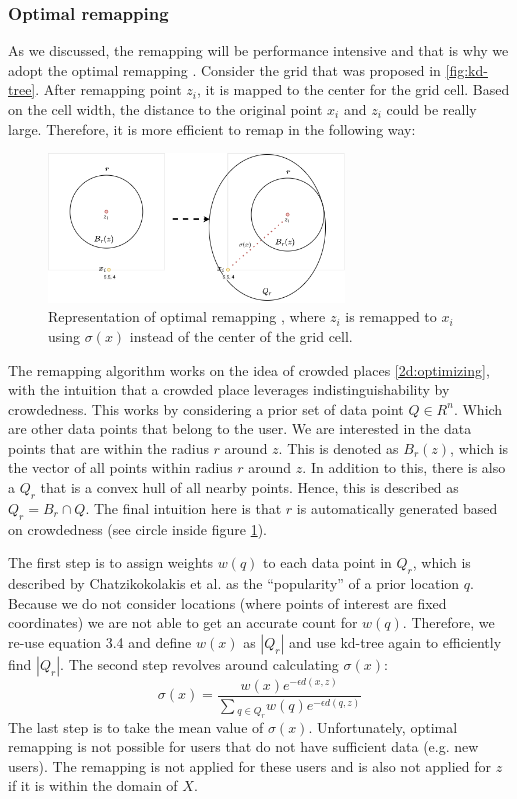 \subsubsection{Optimal remapping} \label{theory:optimal-remapping}
As we discussed, the remapping will be performance intensive and that is why we adopt the optimal remapping \citep{chatzikokolakis_efficient_2017}.
Consider the grid that was proposed in \ref{fig:kd-tree}.
After remapping point $z_i$, it is mapped to the center for the grid cell.
Based on the cell width, the distance to the original point $x_i$ and $ z_i$ could be really large.
Therefore, it is more efficient to remap in the following way:
\begin{figure}[H]
  \includegraphics[width=0.7\textwidth]{TheorethicalFramework/ND-Laplace/Images/optimal-remapping.png}
  \caption{Representation of optimal remapping \citep{chatzikokolakis_efficient_2017}, where $z_i$ is remapped to $x_i$ using $\sigma(x)$ instead of the center of the grid cell.}
  \label{fig:optimal-remapping}
\end{figure}
The remapping algorithm works on the idea of crowded places \ref{2d:optimizing}, with the intuition that a crowded place leverages indistinguishability by crowdedness.
This works by considering a prior set of data point $Q \in R^n$.
Which are other data points that belong to the user.
We are interested in the data points that are within the radius $r$ around $z$.
This is denoted as $B_r(z)$, which is the vector of all points within radius $r$ around $z$.
In addition to this, there is also a $Q_r$ that is a convex hull of all nearby points.
Hence, this is described as $Q_r = B_r \cap Q$.
The final intuition here is that $r$ is automatically generated based on crowdedness (see circle inside figure \ref{fig:optimal-remapping}).

The first step is to assign weights $w(q) $ to each data point in $Q_r$, which is described by Chatzikokolakis et al. as the “popularity” of a prior location $q$.
Because we do not consider locations (where points of interest are fixed coordinates) we are not able to get an accurate count for $w(q)$.
Therefore, we re-use equation 3.4 and define $ w(x)$ as $ |Q_r|$ and use kd-tree again to efficiently find $|Q_r|$.
The second step revolves around calculating $\sigma(x)$:
\begin{equation}
  \sigma(x) = \frac{w(x)e^{-\epsilon d(x, z)}}{\sum{_{q\in Q_r} w(q)e^{-\epsilon d(q, z)}}}
  \label{eq:optimal-remapping-formula-1}
\end{equation}
The last step is to take the mean value of $\sigma(x)$.
Unfortunately, optimal remapping is not possible for users that do not have sufficient data (e.g. new users).
The remapping is not applied for these users and is also not applied for $z$ if it is within the domain of $X$.

